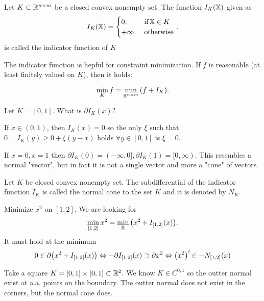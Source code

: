\documentclass[11pt]{scrartcl} %
\begin{document}
\begin{definition}
    Let $K \subset \R^{n \times m}$ be a closed convex nonempty set. The function $I_K\qty(\tensorq{X})$ given as
    \[
	    I_K\qty(\tensorq{X})=\begin{cases}
		    0, & \, \text{if} \, \tensorq{X} \in K \\
		    + \infty,& \, \text{otherwise} \,
	    \end{cases},
    \]
    is called the indicator function of $K$
\end{definition}

The indicator function is hepful for constraint minimization. If $f$ is reasonable (at least finitely valued on $K$), then it holds:

\[
	\min_K f = \min_{\R^{n \times m}}\qty(f + I_K).
\]

\begin{example}

	Let $K = [0,1].$ What is $\partial I_K(x)?$ 

	If $x \in (0,1)$, then $I_K(x) = 0$ so the only $\xi$ such that $0 = I_K(y) \geq 0 + \xi (y-x)$ holds $\forall y \in [0,1]$ is $\xi = 0.$

	If $x = 0, x=1$ then $\partial I_K(0) = (-\infty, 0], \partial I_K(1) = [0, \infty).$ This resembles a normal "vector", but in fact it is not a single vector and more a "cone" of vectors.
\end{example}

\begin{definition}
    Let $K$ be closed convex nonempty set. The subdifferential of the indicator function $I_K$ is called the normal cone to the set $K$ and it is denoted by $N_K$.
\end{definition}

\begin{example}
	Minimize $x^{2}$ on $[1,2]$. We are looking for
	\[
		\min_{[1,2]}x^{2} = \min_{\R}\qty(x^{2}+I_{[1,2]}\qty(x)).
	\]
	It must hold at the minimum
	\[
		0 \in \partial \qty(x^{2}+I_{[1,2]}\qty(x)) \Leftrightarrow - \partial I_{[1,2]}(x) \supset \partial x^{2} \Leftrightarrow \qty(x^{2})' \in -N_{[1,2]}(x)
	\]
\end{example}

\begin{example}
	Take a square $K = [0,1] \times [0,1] \subset \R^2.$ We know $K \in C^{0,1}$ so the outter normal exist at a.a. points on the boundary. The outter normal does not exist in the corners, but the normal cone does.
	\begin{tikzpicture}
	\end{tikzpicture}
\end{example}
\end{document}
